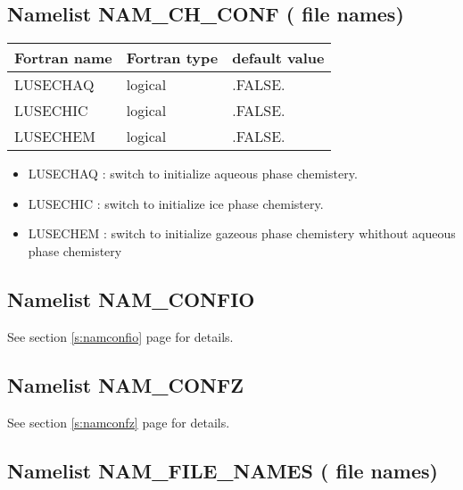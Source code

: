 \subsection{Namelist NAM\_CH\_CONF ( file names)}

\begin{center}
\begin{tabular} {|l|l|l|}
\hline
Fortran name & Fortran type & default value\\
\hline
\hline
LUSECHAQ  & logical  & .FALSE.  \\
LUSECHIC  & logical  & .FALSE.   \\
LUSECHEM  & logical  & .FALSE.   \\

\hline
\end{tabular}
\end{center}

\begin{itemize}
\item LUSECHAQ : switch to initialize aqueous phase chemistery.
\item LUSECHIC : switch to initialize ice  phase chemistery.
\item LUSECHEM : switch to initialize gazeous phase chemistery whithout aqueous phase chemistery

\end{itemize}

\subsection{Namelist NAM\_CONFIO}
See section \ref{s:namconfio} page \pageref{s:namconfio} for details.

\subsection{Namelist NAM\_CONFZ}
See section \ref{s:namconfz} page \pageref{s:namconfz} for details.

\subsection{Namelist NAM\_FILE\_NAMES ( file names)}

